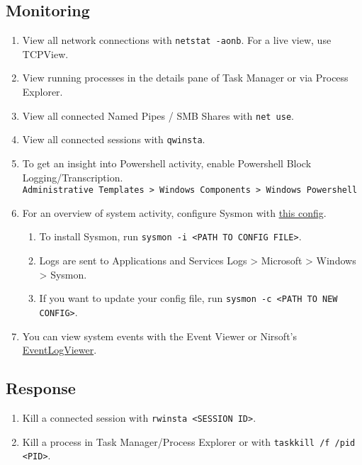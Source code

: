 \documentclass[12pt,letterpaper]{article}
\def\code#1{\textcolor{c2}{\texttt{#1}}}
\begin{document}
\subsection{Monitoring}

\begin{enumerate}
	\item View all network connections with \code{netstat -aonb}. For a live view, use TCPView.
	\item View running processes in the details pane of Task Manager or via Process Explorer.
	\item View all connected Named Pipes / SMB Shares with \code{net use}.
	\item View all connected sessions with \code{qwinsta}.
	\item To get an insight into Powershell activity, enable Powershell Block Logging/Transcription. \\
		\code{Administrative Templates > Windows Components > Windows Powershell}
	\item For an overview of system activity, configure Sysmon with \href{https://github.com/D42H5/cyber_comp_resources/blob/main/sysmonconfig-export-modified-2-2-24.xml}{this config}.
	\begin{enumerate}
		\item To install Sysmon, run \code{sysmon -i <PATH TO CONFIG FILE>}.
		\item Logs are sent to Applications and Services Logs > Microsoft > Windows > Sysmon.
		\item If you want to update your config file, run \code{sysmon -c <PATH TO NEW CONFIG>}. 
	\end{enumerate}
	\item You can view system events with the Event Viewer or Nirsoft's \href{https://www.nirsoft.net/utils/fulleventlogview-x64.zip}{EventLogViewer}.
\end{enumerate}

\subsection{Response}

\begin{enumerate}
	\item Kill a connected session with \code{rwinsta <SESSION ID>}.
	\item Kill a process in Task Manager/Process Explorer or with \code{taskkill /f /pid <PID>}.
\end{enumerate}
\end{document}
